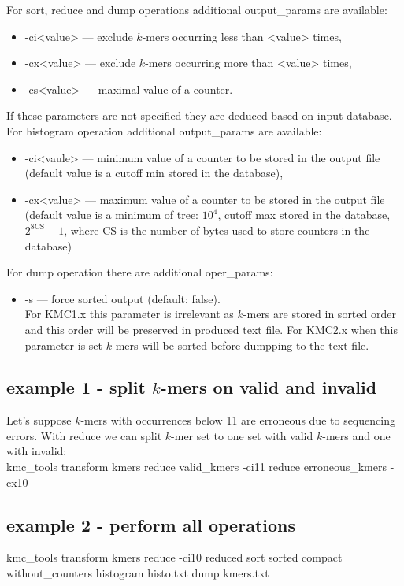 For \textsf{sort}, \textsf{reduce} and \textsf{dump} operations additional \textsf{output\_params} are available:
\begin{itemize}
	\item \textsf{-ci<value>} --- exclude $k$-mers occurring less than <value> times,
	\item \textsf{-cx<value>} --- exclude $k$-mers occurring more than <value> times,
	\item \textsf{-cs<value>} --- maximal value of a counter.
\end{itemize}

If these parameters are not specified they are deduced based on input database. \\

For \textsf{histogram} operation additional \textsf{output\_params} are available:
\begin{itemize}
	\item \textsf{-ci<vaule>} --- minimum value of a counter to be stored in the output file (default value is a cutoff min stored in the database),
	\item \textsf{-cx<value>} --- maximum value of a counter to be stored in the output file (default value is a minimum of tree: $10^4$, cutoff max stored in the database, $2^{8\mathrm{CS}}-1$, where CS is the number of bytes used to store counters in the database)
\end{itemize}

For dump operation there are additional \textsf{oper\_params}:
\begin{itemize}
	\item \textsf{-s} --- force sorted output (default: false). \\
	For \textsf{KMC1.x} this parameter is irrelevant as $k$-mers are stored in sorted order and this order will be preserved in produced text file. For \textsf{KMC2.x} when this parameter is set $k$-mers will be sorted before dumpping to the text file.
\end{itemize}


\subsection *{example 1 - split $k$-mers on valid and invalid}
Let's suppose $k$-mers with occurrences below 11 are erroneous due to sequencing errors. With \textsf{reduce} we can split $k$-mer set to one set with valid $k$-mers and one with invalid: \\
kmc\_tools transform kmers reduce valid\_kmers -ci11 reduce erroneous\_kmers -cx10

\subsection*{example 2 - perform all operations}
kmc\_tools transform kmers reduce -ci10 reduced sort sorted compact without\_counters histogram histo.txt dump kmers.txt
